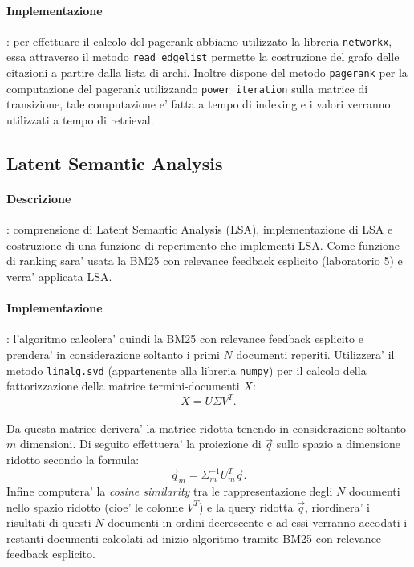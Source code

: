 \paragraph{\textbf{Implementazione}}: per effettuare il calcolo del pagerank abbiamo utilizzato la libreria \texttt{networkx}, essa attraverso il metodo \texttt{read\_edgelist} permette la costruzione del grafo delle citazioni a partire dalla lista di archi. Inoltre dispone del metodo \texttt{pagerank} per la computazione del pagerank utilizzando \texttt{power iteration} sulla matrice di transizione, tale computazione e' fatta a tempo di indexing e i valori verranno utilizzati a tempo di retrieval.

\subsection{Latent Semantic Analysis}
\label{sec:lsa}

\paragraph{\textbf{Descrizione}}: comprensione di Latent Semantic Analysis (LSA), implementazione di LSA e costruzione di una funzione di reperimento che implementi LSA.
Come funzione di ranking sara' usata la BM25 con relevance feedback esplicito (laboratorio 5) e verra' applicata LSA. 


\paragraph{\textbf{Implementazione}}: l'algoritmo calcolera' quindi la BM25 con relevance feedback esplicito e prendera' in considerazione soltanto i primi $N$ documenti reperiti. Utilizzera' il metodo \texttt{linalg.svd} (appartenente alla libreria \texttt{numpy}) per il calcolo della fattorizzazione della matrice termini-documenti $X$: 
\[ X = U \Sigma V^{T}. \]\\
Da questa matrice derivera' la matrice ridotta tenendo in considerazione soltanto $m$ dimensioni. Di seguito effettuera' la proiezione di $\vec{q}$ sullo spazio a dimensione ridotto secondo la formula: 
\[ \vec{q}_m = \Sigma^{-1}_m U^{T}_m \vec{q}. \]
Infine computera' la \textit{cosine similarity} tra le rappresentazione degli $N$ documenti nello spazio ridotto (cioe' le colonne $V^{T}$) e la query ridotta $\vec{q}$, riordinera' i risultati di questi $N$ documenti in ordini decrescente e ad essi verranno accodati i restanti documenti calcolati ad inizio algoritmo tramite BM25 con relevance feedback esplicito.


